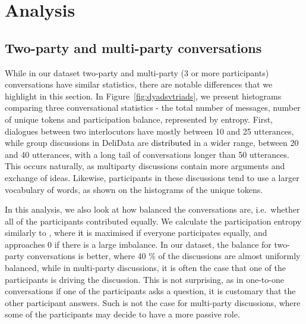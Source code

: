 \documentclass[acmsmall,manuscript,screen]{acmart}
\newcommand\newtext[1]{\textcolor{black}{#1}}
\begin{document}
\section{Analysis}
\label{sec:analysis}
\subsection{Two-party and multi-party conversations}

While in our dataset two-party and multi-party (3 or more participants) conversations have similar statistics, there are notable differences that we highlight in this section. 
In Figure~\ref{fig:dyadsvtriads}, we present histograms comparing three conversational statistics - the total number of messages, number of unique tokens and participation balance, represented by entropy. First, dialogues between two interlocutors have mostly between 10 and 25 utterances, while group discussions in DeliData are \newtext{distributed}
in a wider range, between 20 and 40 utterances, with a long tail of conversations longer than 50 utterances. This  occurs naturally, as multiparty discussions contain more arguments and exchange of ideas. Likewise, participants in these discussions tend to use a larger vocabulary of words, as shown on the histograms of the unique tokens. 

In this analysis, we also look at how balanced the conversations are, i.e.\ whether all of the participants contributed equally. We calculate the participation entropy similarly to \citet{niculae2016conversational}, where \newtext{it}
is maximised if everyone participates equally, and approaches 0 if there is a large imbalance. In our dataset, the balance for two-party conversations is better, where 40 \% of the discussions are almost uniformly balanced, while in multi-party discussions, it is often the case that one of the participants is driving the discussion. This is not surprising, as in one-to-one conversations if one of the participants asks a question, it is customary that the other participant answers. Such is not the case for multi-party discussions, where some of the participants may decide to have a more passive role.

\par
\end{document}

